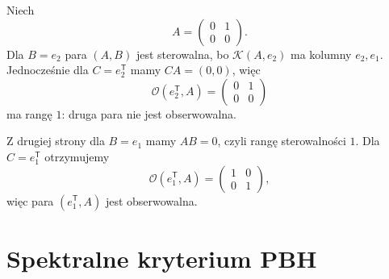 \begin{przyklad}
\label{prz:lin25-dual-examples}
Niech
\[
 A=\begin{pmatrix}0&1\\0&0\end{pmatrix}.
\]
Dla \(B=e_2\)
para \((A,B)\) jest sterowalna,
bo \(\mathcal K(A,e_2)\)
ma kolumny \(e_2,e_1\).
Jednocześnie dla \(C=e_2^{\mathsf T}\)
mamy
\(CA=(0,0)\),
więc
\[
 \mathcal O(e_2^{\mathsf T},A)
 =\begin{pmatrix}0&1\\0&0\end{pmatrix}
\]
ma rangę \(1\):
druga para nie jest obserwowalna.

Z drugiej strony
dla \(B=e_1\)
mamy \(AB=0\),
czyli rangę sterowalności \(1\).
Dla \(C=e_1^{\mathsf T}\)
otrzymujemy
\[
 \mathcal O(e_1^{\mathsf T},A)
 =\begin{pmatrix}1&0\\0&1\end{pmatrix},
\]
więc para \((e_1^{\mathsf T},A)\)
jest obserwowalna.
\end{przyklad}

\section{Spektralne kryterium PBH}
\label{sec:lin25-pbh}

